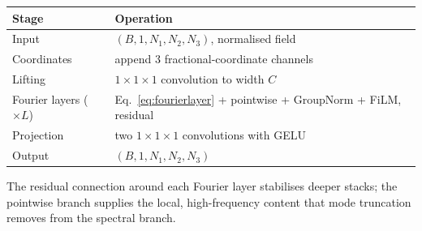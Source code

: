\begin{center}
\begin{tabular}{@{}ll@{}}
\toprule
Stage & Operation \\
\midrule
Input & $(B, 1, N_1, N_2, N_3)$, normalised field \\
Coordinates & append 3 fractional-coordinate channels \\
Lifting & $1\times1\times1$ convolution to width $C$ \\
Fourier layers ($\times L$) & Eq.~\eqref{eq:fourierlayer} + pointwise + GroupNorm + FiLM, residual \\
Projection & two $1\times1\times1$ convolutions with GELU \\
Output & $(B, 1, N_1, N_2, N_3)$ \\
\bottomrule
\end{tabular}
\end{center}

The residual connection around each Fourier layer stabilises deeper stacks; the
pointwise branch supplies the local, high-frequency content that mode
truncation removes from the spectral branch.
